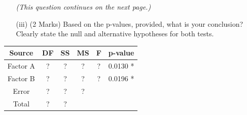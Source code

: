 \documentclass[a4paper,12pt]{article}
\begin{document}
\begin{itemize}
\begin{itemize}
\textit{(This question continues on the next page.)}		
\newpage
		\item[(iii)] (2 Marks) Based on the p-values, provided, what is your conclusion? Clearly state the null and alternative hypotheses for both tests.
	\end{itemize}
	
	\begin{center}
		\begin{tabular}{|c||c|c|c|c|l|}
			\hline Source & DF & SS & MS & F & p-value \\ \hline 
		 Factor A & \phantom{mak} ? \phantom{mak}  & \phantom{mak} ? \phantom{mak}  & \phantom{mak} ? \phantom{mak}  & \phantom{mak} ? \phantom{mak}  &0.0130 * \\ 
			\hline Factor B & \phantom{mak} ? \phantom{mak}  & \phantom{mak} ? \phantom{mak}  & \phantom{mak} ? \phantom{mak}  & \phantom{mak} ? \phantom{mak}  & 0.0196 *    \\ \hline
		Error &  ? & ? & \phantom{mak} ? \phantom{mak}  &  &  \\ 
			\hline \hline Total & ? & ? &  &  &  \\ 
			\hline 
		\end{tabular}
	\end{center} 
\end{itemize}




	
\end{document}
